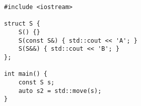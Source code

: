 \begin{lstlisting}[title=\href{https://godbolt.org/z/r9hv8K}{\texttt{godbolt.org/z/r9hv8K}}]
#include <iostream>

struct S {
    S() {}
    S(const S&) { std::cout << 'A'; }
    S(S&&) { std::cout << 'B'; }
};

int main() {
    const S s;
    auto s2 = std::move(s);
}
\end{lstlisting}
